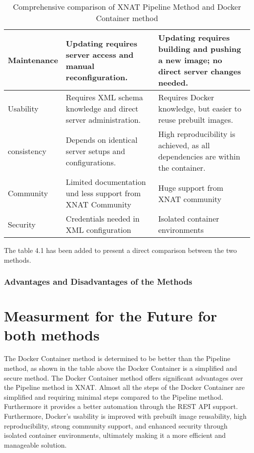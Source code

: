 \begin{table}[H]
\begin{tabular}{|>{\centering\arraybackslash}p{4cm}|
                    >{\centering\arraybackslash}p{5cm}|
                    >{\centering\arraybackslash}p{5cm}|}
Maintenance & Updating requires server access and manual reconfiguration.& Updating requires building and pushing a new image; no direct server changes needed.\\ \hline
Usability& Requires XML schema knowledge and direct server administration.& Requires Docker knowledge, but easier to reuse prebuilt images.\\ \hline
consistency& Depends on identical server setups and configurations.& High reproducibility is achieved, as all dependencies are within the container.\\ \hline
Community& Limited documentation und less support from XNAT Community& Huge support from XNAT community\\ \hline
Security& Credentials needed in XML configuration& Isolated container environments\\ \hline
    \end{tabular}
    \caption{Comprehensive comparison of XNAT Pipeline Method and Docker Container method}
    \label{tab:pipeline-vs-docker}
\end{table}
 The table 4.1 has been added to present a direct comparison between the two methods.















 
 \subsection{Advantages and Disadvantages of the Methods}
 
\chapter{Measurment for the Future for both methods}

The Docker Container method is determined to be better than the Pipeline method, as shown in the table above the Docker Container is a simplified and secure method.  
The Docker Container method offers significant advantages over the Pipeline method in XNAT.
Almost all the steps of the Docker Container are simplified and requiring minimal steps compared to the Pipeline method. Furthermore it provides a better automation through the REST API support.  Furthermore, Docker's usability is improved with prebuilt image reusability, high reproducibility, strong community support, and enhanced security through isolated container environments, ultimately making it a more efficient and manageable solution.

